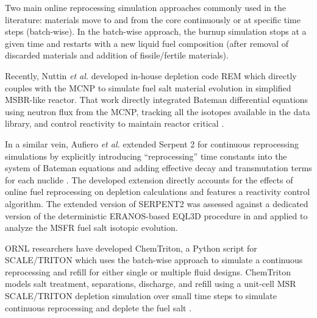 Two main online reprocessing simulation approaches commonly used in the 
literature: materials move to and from the core continuously or at specific 
time steps (batch-wise). In the batch-wise approach, the burnup simulation 
stops at a given time and restarts with a new liquid fuel composition 
(after removal of discarded materials and addition of fissile/fertile 
materials).

Recently, Nuttin \emph{et al.} developed in-house 
depletion code REM which directly couples with the \gls{MCNP}  
\cite{noauthor_mcnp_2004} to simulate fuel salt material evolution in 
simplified \gls{MSBR}-like reactor. That work directly integrated
Bateman differential equations using neutron flux from the \gls{MCNP}, 
tracking all the isotopes available in the data library, and control 
reactivity to maintain reactor critical \cite{nuttin_potential_2005}.

In a similar vein, Aufiero \emph{et al.} extended Serpent 2 for continuous 
reprocessing simulations by explicitly introducing ``reprocessing'' time 
constants into the system of Bateman equations and adding effective decay and 
transmutation terms for each nuclide \cite{aufiero_extended_2013}. The 
developed extension directly accounts for the effects of online fuel 
reprocessing on depletion calculations and features a reactivity control 
algorithm. The extended version of SERPENT2 was assessed against a dedicated 
version of the deterministic ERANOS-based EQL3D procedure in 
\cite{fiorina_investigation_2013} and applied to analyze the \gls{MSFR} fuel 
salt isotopic evolution.


\gls{ORNL} researchers have developed ChemTriton, a Python script for
SCALE/TRITON which uses the batch-wise approach to simulate a continuous 
reprocessing and refill for either single or multiple fluid designs. 
ChemTriton models salt treatment, separations, discharge, and refill using a 
unit-cell MSR SCALE/TRITON depletion simulation over small time steps to 
simulate continuous reprocessing and deplete the fuel salt 
\cite{powers_new_2013, betzler_fuel_2018}.

